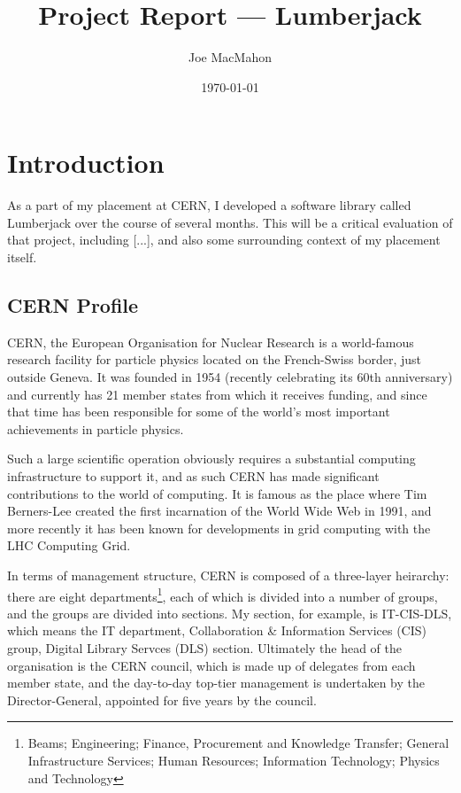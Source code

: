 \documentclass[a4paper,11pt]{article} %
\title{Project Report --- Lumberjack}
\author{Joe MacMahon}
\date{\today}
\begin{document}
\maketitle

\section{Introduction}
\label{sec:introduction}
As a part of my placement at CERN, I developed a software library called
Lumberjack over the course of several months.  This will be a critical
evaluation of that project, including [...], and also some surrounding context
of my placement itself.

\subsection{CERN Profile}
\label{sec:cern}
CERN, the European Organisation for Nuclear Research is a world-famous research
facility for particle physics located on the French-Swiss border, just outside
Geneva.  It was founded in 1954 (recently celebrating its 60th anniversary) and
currently has 21 member states from which it receives funding, and since that
time has been responsible for some of the world's most important achievements
in particle physics.

Such a large scientific operation obviously requires a substantial computing
infrastructure to support it, and as such CERN has made significant
contributions to the world of computing.  It is famous as the place where Tim
Berners-Lee created the first incarnation of the World Wide Web in 1991, and
more recently it has been known for developments in grid computing with the LHC
Computing Grid.

In terms of management structure, CERN is composed of a three-layer heirarchy:
there are eight departments\footnote{Beams; Engineering; Finance, Procurement
  and Knowledge Transfer; General Infrastructure Services; Human Resources;
  Information Technology; Physics and Technology}, each of which is divided
into a number of groups, and the groups are divided into sections.  My section,
for example, is IT-CIS-DLS, which means the IT department, Collaboration \&
Information Services (CIS) group, Digital Library Servces (DLS) section.
Ultimately the head of the organisation is the CERN council, which is made up
of delegates from each member state, and the day-to-day top-tier management is
undertaken by the Director-General, appointed for five years by the council.
\end{document}
